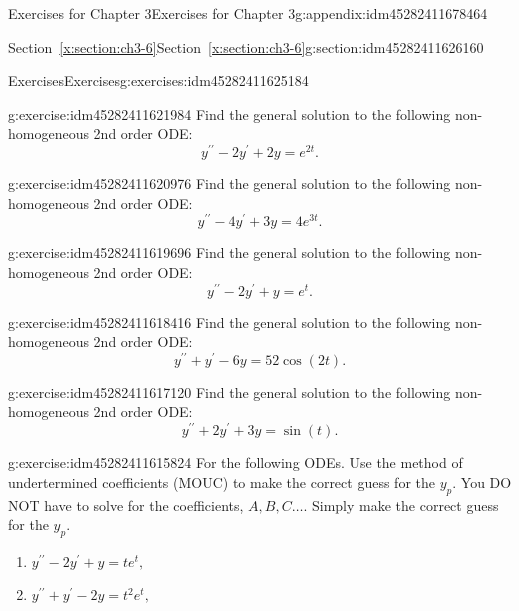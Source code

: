 \documentclass[oneside,10pt,]{book}
\numberwithin{equation}{section}
\numberwithin{equation}{section}
\begin{document}
\begin{appendixptx}{Exercises for Chapter 3}{}{Exercises for Chapter 3}{}{}{g:appendix:idm45282411678464}
\begin{sectionptx}{Section~\ref*{x:section:ch3-6}}{}{Section~\ref*{x:section:ch3-6}}{}{}{g:section:idm45282411626160}
\begin{exercises-subsection-numberless}{Exercises}{}{Exercises}{}{}{g:exercises:idm45282411625184}
\begin{divisionexercise}{2}{}{}{g:exercise:idm45282411621984}%
Find the general solution to the following non-homogeneous 2nd order ODE:%
\begin{equation*}
y^{\prime\prime}-2y^{\prime}+2y=e^{2t}.
\end{equation*}
\end{divisionexercise}%
\begin{divisionexercise}{3}{}{}{g:exercise:idm45282411620976}%
Find the general solution to the following non-homogeneous 2nd order ODE:%
\begin{equation*}
y^{\prime\prime}-4y^{\prime}+3y=4e^{3t}.
\end{equation*}
%
\end{divisionexercise}%
\begin{divisionexercise}{4}{}{}{g:exercise:idm45282411619696}%
Find the general solution to the following non-homogeneous 2nd order ODE:%
\begin{equation*}
y^{\prime\prime}-2y^{\prime}+y=e^{t}.
\end{equation*}
%
\end{divisionexercise}%
\begin{divisionexercise}{5}{}{}{g:exercise:idm45282411618416}%
Find the general solution to the following non-homogeneous 2nd order ODE:%
\begin{equation*}
y^{\prime\prime}+y^{\prime}-6y=52\cos\left(2t\right).
\end{equation*}
%
\end{divisionexercise}%
\begin{divisionexercise}{6}{}{}{g:exercise:idm45282411617120}%
Find the general solution to the following non-homogeneous 2nd order ODE:%
\begin{equation*}
y^{\prime\prime}+2y^{\prime}+3y=\sin\left(t\right).
\end{equation*}
%
\end{divisionexercise}%
\begin{divisionexercise}{7}{}{}{g:exercise:idm45282411615824}%
For the following ODEs. Use the method of undertermined coefficients (MOUC) to make the correct guess for the \(y_{p}\). You DO NOT have to solve for the coefficients, \(A,B,C\dots\). Simply make the correct guess for the \(y_{p}\).%
\begin{enumerate}[label=(\alph*)]
\item{}\(y^{\prime\prime}-2y^{\prime}+y=te^{t},\)%
\item{}\(y^{\prime\prime}+y^{\prime}-2y=t^{2}e^{t},\)%

\end{enumerate}
\end{divisionexercise}
\end{exercises-subsection-numberless}
\end{sectionptx}
\end{appendixptx}
\end{document}
